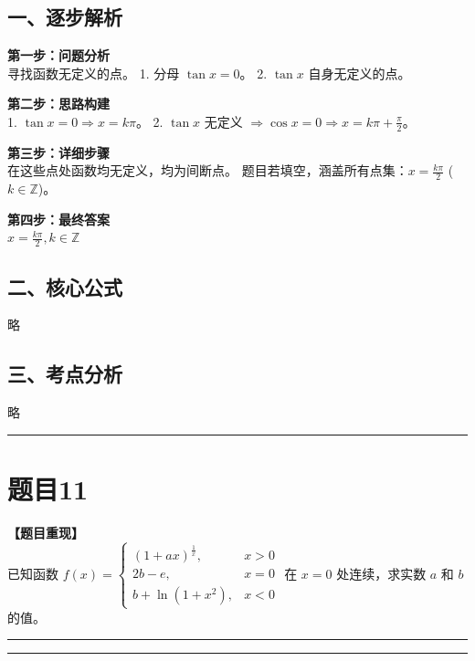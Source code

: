 \documentclass[12pt, a4paper]{ctexart}
\newcommand{\TopSeparator}{
    \par\noindent\rule{\textwidth}{1.5pt}\vspace{0.5em} %
}
\newcommand{\AnalysisSeparator}{
    \par\noindent\rule{\textwidth}{0.5pt}\vspace{0.2em}\hrule\vspace{0.5em} %
}
\newenvironment{RedAnalysis}{
    \par
    \color{red} %
}{
    \par
    \color{black} %
}
\begin{document}
\begin{RedAnalysis}

\subsection*{一、逐步解析}

\textbf{第一步：问题分析} \\
寻找函数无定义的点。
1. 分母 $\tan x = 0$。
2. $\tan x$ 自身无定义的点。

\textbf{第二步：思路构建} \\
1. $\tan x = 0 \Rightarrow x = k\pi$。
2. $\tan x$ 无定义 $\Rightarrow \cos x = 0 \Rightarrow x = k\pi + \frac{\pi}{2}$。

\textbf{第三步：详细步骤} \\
在这些点处函数均无定义，均为间断点。
题目若填空，涵盖所有点集：$x = \frac{k\pi}{2}$ ($k \in \mathbb{Z}$)。

\textbf{第四步：最终答案} \\
$x = \frac{k\pi}{2}, k\in\mathbb{Z}$

\subsection*{二、核心公式}
略

\subsection*{三、考点分析}
略

\end{RedAnalysis}

\vspace{2em}

\TopSeparator
\section*{题目11}

\textbf{【题目重现】} \\
已知函数 $ f(x)=\begin{cases}(1+ax)^{\frac{1}{x}}, & x>0\\ 2b-e, & x=0\\ b+\ln(1+x^{2}), & x<0\end{cases} $ 在 $x=0$ 处连续，求实数 $a$ 和 $b$ 的值。

\AnalysisSeparator
\end{document}
